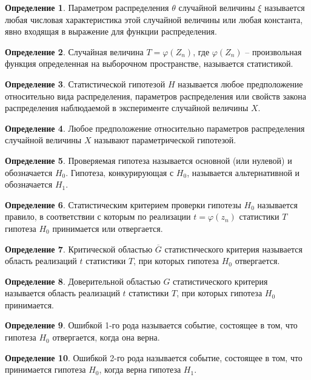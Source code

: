 \documentclass[12pt]{article}
\theoremstyle{definition}
\newtheorem{definition}{Определение}
\begin{document}
\begin{definition}
    Параметром распределения $\theta$ случайной величины $\xi$ называется любая числовая характеристика этой случайной величины или любая константа, явно входящая в выражение для функции распределения.
\end{definition}
\begin{definition}
    Случайная величина $T=\varphi(Z_n)$, где $\varphi(Z_n)$ – произвольная функция определенная на выборочном пространстве, называется статистикой.
\end{definition}
\begin{definition}
    Статистической гипотезой $H$ называется любое предположение относительно вида распределения, параметров распределения или свойств закона распределения наблюдаемой в эксперименте случайной величины $X$.
\end{definition}
\begin{definition}
    Любое предположение относительно параметров распределения случайной величины $X$ называют параметрической гипотезой.
\end{definition}
\begin{definition}
    Проверяемая гипотеза называется основной (или нулевой) и обозначается $H_0$. Гипотеза, конкурирующая с $H_0$, называется альтернативной и обозначается $H_1$.
\end{definition}
\begin{definition}
    Статистическим критерием проверки гипотезы $H_0$ называется правило, в соответствии с которым по реализации $t=\varphi(z_n)$ статистики $T$ гипотеза $H_0$ принимается или отвергается.
\end{definition}
\begin{definition}
    Критической областью $\overline{G}$ статистического критерия называется область реализаций $t$ статистики $T$, при которых гипотеза $H_0$ отвергается.
\end{definition}
\begin{definition}
    Доверительной областью $G$ статистического критерия называется область реализаций $t$ статистики $T$, при которых гипотеза $H_0$ принимается.
\end{definition}
\begin{definition}
    Ошибкой 1-го рода называется событие, состоящее в том, что гипотеза $H_0$ отвергается, когда она верна.
\end{definition}
\begin{definition}
    Ошибкой 2-го рода называется событие, состоящее в том, что принимается гипотеза $H_0$, когда верна гипотеза $H_1$.
\end{definition}
\end{document}
